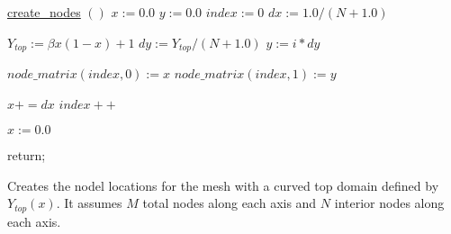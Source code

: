 \documentclass[a4paper, 12pt]{article}
\begin{document}
\begin{algorithm}
  \underline{create\_nodes} $()$
  \BlankLine
  $x := 0.0$ \;
  $y := 0.0$ \;
  $index := 0$ \;
  $dx := 1.0 / (N+1.0)$\;
  {
    {
      $Y_{top} := \beta x (1-x) + 1$\;
      $dy := Y_{top} / (N+1.0)$\;
      $y := i * dy$\;

      $node\_matrix( index, 0) := x$\;
      $node\_matrix( index, 1) := y$\;

      $x += dx$\;
      $index++$\;
    }
    $x := 0.0$\;
  }
  return;
  \caption{Creates the nodel locations for the mesh with 
           a curved top domain defined by $Y_{top}(x)$. 
           It assumes $M$ total nodes along each axis 
           and $N$ interior nodes along each axis.}
  \label{al:create_nodes}
\end{algorithm}



\end{document}
